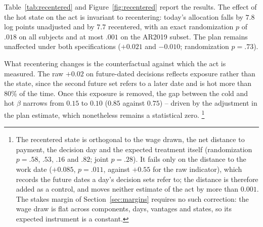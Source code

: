 \documentclass[11pt,a4paper]{article}
\theoremstyle{plain}
\theoremstyle{definition}
\begin{document}
\noindent
Table~\ref{tab:recentered} and Figure~\ref{fig:recentered} report the results. The effect of the hot state on the act is invariant to recentering: today's allocation falls by $7.8$ log points unadjusted and by $7.7$ recentered, with an exact randomization $p$ of $.018$ on all subjects and at most $.001$ on the AR2019 subset. The plan remains unaffected under both specifications ($+0.021$ and $-0.010$; randomization $p=.73$). 

What recentering changes is the counterfactual against which the act is measured. The raw $+0.02$ on future-dated decisions reflects exposure rather than the state, since the second future set refers to a later date and is hot more than 80\% of the time. 
Once this exposure is removed, the gap between the cold and hot $\beta$ narrows from $0.15$ to $0.10$ ($0.85$ against $0.75$) 
-- driven by the adjustment in the plan estimate, which nonetheless remains a statistical zero.
\footnote{%
The recentered state is orthogonal to the wage drawn, the net distance to payment, the decision day and the expected treatment itself (randomization $p=.58$, $.53$, $.16$ and $.82$; joint $p=.28$). It fails only on the distance to the work date ($+0.085$, $p=.011$, against $+0.55$ for the raw indicator), which records the future dates a day's decision sets refer to; the distance is therefore added as a control, and moves neither estimate of the act by more than $0.001$. The stakes margin of Section~\ref{sec:margins} requires no such correction: the wage draw is flat across components, days, vantages and states, so its expected instrument is a constant.}
\end{document}
